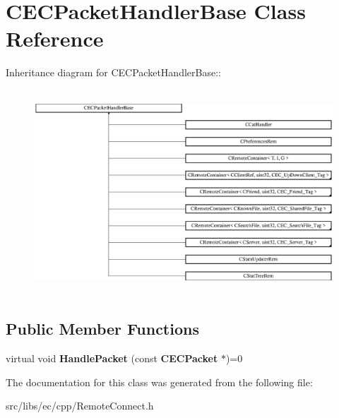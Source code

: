 \section{CECPacketHandlerBase Class Reference}
\label{classCECPacketHandlerBase}
Inheritance diagram for CECPacketHandlerBase::\begin{figure}[H]
\begin{center}
\leavevmode
\includegraphics[height=7.6808cm]{classCECPacketHandlerBase}
\end{center}
\end{figure}
\subsection*{Public Member Functions}
\begin{DoxyCompactItemize}
\item 
virtual void {\bfseries HandlePacket} (const {\bf CECPacket} $\ast$)=0\label{classCECPacketHandlerBase_a59ea0130446d29130d21c61e132772f8}

\end{DoxyCompactItemize}


The documentation for this class was generated from the following file:\begin{DoxyCompactItemize}
\item 
src/libs/ec/cpp/RemoteConnect.h\end{DoxyCompactItemize}
